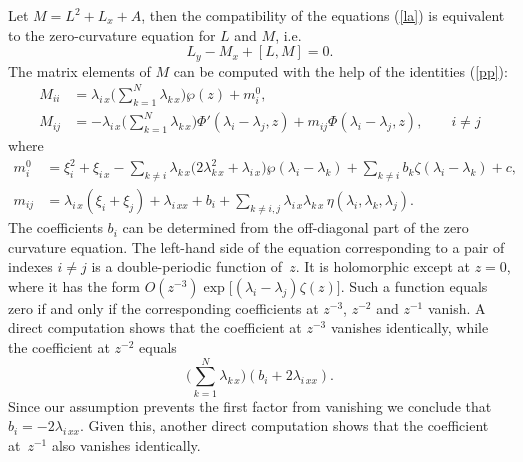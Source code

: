\documentclass[a4paper,11pt]{article}
\theoremstyle{plain}
\theoremstyle{remark}
\begin{document}
Let $M=L^2+L_x+A$, then the compatibility of the equations (\ref{la})
is equivalent to the zero-curvature equation for $L$ and $M$, i.e.
\begin{equation}\label{zc}
L_y-M_x+[L,M]=0 .
\end{equation}
The matrix elements of $M$ can be computed with the help of the
identities (\ref{pp}):
\begin{equation}\label{mij}
\begin{aligned}
M_{ii} &=\lambda_{i\,x} \biggl(\sum_{k=1}^N \lambda_{k\,x}\biggr)
\wp(z)+m_{i}^0, \\
M_{ij} &=-\lambda_{i\,x} \biggl(\sum_{k=1}^N \lambda_{k\,x}\biggr)
\Phi'(\lambda_i-\lambda_j,z)+m_{ij}\Phi(\lambda_i-\lambda_j,z),\qquad i\ne j
\end{aligned}
\end{equation}
where
$$
\begin{aligned}
m_{i}^0 &=\xi_i^2+\xi_{i\,x}-\sum_{k\ne i} \lambda_{k\,x}
\bigl( 2\lambda_{k\,x}^2+\lambda_{i\,x} \bigr)\wp(\lambda_i-\lambda_k)
+\sum_{k\ne i} b_k\zeta(\lambda_i-\lambda_k)+c ,\\
m_{ij} &=\lambda_{i\,x}(\xi_i+\xi_j)+\lambda_{i\,xx}+b_i+
\sum_{k\ne i,j} \lambda_{i\,x}\lambda_{k\,x}\,
\eta(\lambda_i,\lambda_k,\lambda_j) .
\end{aligned}
$$
The coefficients $b_i$ can be determined from the off-diagonal part
of the zero curvature equation. The left-hand side of the equation
corresponding to a pair of indexes $i\ne j$ is a double-periodic function
of~$z$. It is holomorphic except at $z=0$, where it has the form
$O(z^{-3})\exp\bigl[(\lambda_i-\lambda_j)\zeta(z)\bigr]$. Such a function equals
zero if and only if the corresponding coefficients at $z^{-3}$, $z^{-2}$
and $z^{-1}$ vanish. A direct computation shows that the coefficient
at $z^{-3}$ vanishes identically, while the coefficient at $z^{-2}$
equals
$$
\biggl( \sum_{k=1}^N \lambda_{k\,x} \biggr)(b_i+2\lambda_{i\,xx}) .
$$
Since our assumption prevents the first factor from vanishing we conclude
that $b_i=-2\lambda_{i\,xx}$. Given this, another direct computation shows
that the coefficient at~$z^{-1}$ also vanishes identically.
\end{document}

